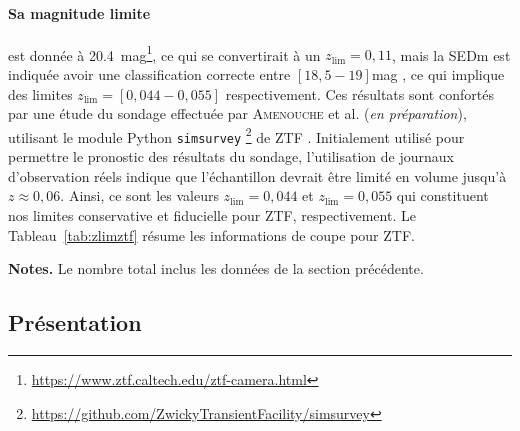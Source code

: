 \documentclass[../main/main.tex]{subfiles}
\begin{document}
\paragraph*{Sa magnitude limite} est donnée à
\SI{20.4}{mag}\footnote{\href{https://www.ztf.caltech.edu/ztf-camera.html}
{https://www.ztf.caltech.edu/ztf-camera.html}}, ce qui se convertirait à un
$z_{\lim} = 0,11$, mais la SEDm est indiquée avoir une classification correcte
entre $[18,5-19]$\si{mag} \citep{fremling2020}, ce qui implique des limites
$z_{\lim} = [0,044-0,055]$ respectivement. Ces résultats sont confortés par une
étude du sondage effectuée par \textsc{Amenouche} et al. (\textit{en
préparation}), utilisant le module Python
\texttt{simsurvey}
\footnote{\href{https://github.com/ZwickyTransientFacility/simsurvey}
{https://github.com/ZwickyTransientFacility/simsurvey}} de ZTF
\citep{feindt2019}. Initialement utilisé pour permettre le pronostic des
résultats du sondage, l'utilisation de journaux d'observation réels indique que
l'échantillon devrait être limité en volume jusqu'à $z \approx 0,06$. Ainsi, ce
sont les valeurs $z_{\lim} = 0,044$ et $z_{\lim} = 0,055$ qui constituent nos
limites conservative et fiducielle pour ZTF, respectivement. Le
Tableau~\ref{tab:zlimztf} résume les informations de coupe pour ZTF.

\begin{table}[ht]
    \centering
        \caption{Composition en SNe~Ia pour notre échantillon ZTF.}
        \label{tab:zlimztf}
    \begin{threeparttable}
        \begin{tablenotes}[flushleft]
            \item\small \textbf{\hspace{-3,2pt}Notes.} Le nombre total inclus les
                données de la section précédente.
        \end{tablenotes}
    \end{threeparttable}
\end{table}

\subsection{Présentation}\label{ssec:ztfpres}
\end{document}
